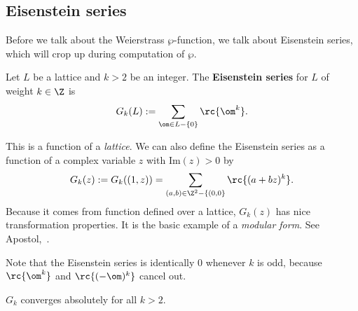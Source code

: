 \subsection{Eisenstein series}
Before we talk about the Weierstrass $\wp$-function, we talk about Eisenstein series, which will crop up during computation of $\wp$.
\begin{df}
Let $L$ be a lattice and $k>2$ be an integer.
The \textbf{Eisenstein series} for $L$ of weight $k\in \Z$ is
\[
G_k(L):=\sum_{\om\in L-\{0\}} \rc{\om^k}.
\]
\end{df}
\begin{rem}
This is a function of a {\it lattice}. We can also define the Eisenstein series as a function of a complex variable $z$ with $\textrm{Im} (z)>0$ by
\[
G_k(z):=G_k((1,z))=\sum_{(a,b)\in \Z^2-\{(0,0\}}\rc{(a+bz)^k}.
\]
Because it comes from function defined over a lattice, $G_k(z)$ has nice transformation properties. It is the basic example of a {\it modular form}. See Apostol,~\cite{Ap94}.
\end{rem}
\begin{rem}\label{rem:k-odd-zero}
Note that the Eisenstein series is identically 0 whenever $k$ is odd, because $\rc{\om^k}$ and $\rc{(-\om)^k}$ cancel out.
\end{rem}
\begin{lem}\label{lem:gk-conv}
$G_k$ converges absolutely for all $k>2$.
\end{lem}
